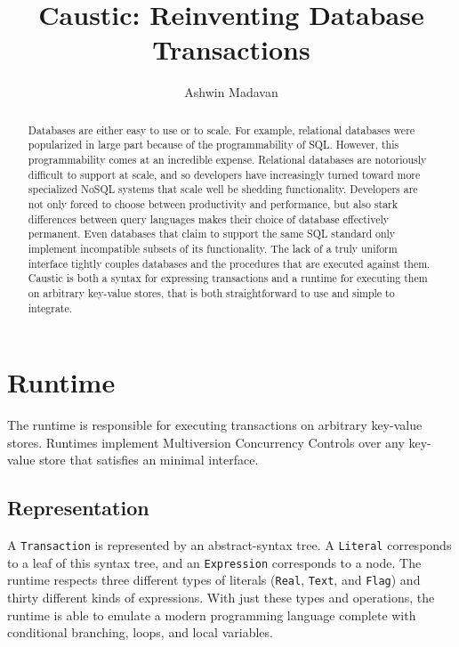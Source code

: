 \documentclass[12pt]{article}
\begin{document}
\title{Caustic: Reinventing Database Transactions}
\author{Ashwin Madavan}
\maketitle

\begin{abstract}
Databases are either easy to use or to scale. For example, relational databases were popularized in
large part because of the programmability of SQL. However, this programmability comes at an
incredible expense. Relational databases are notoriously difficult to support at scale, and so
developers have increasingly turned toward more specialized NoSQL systems that scale well be
shedding functionality. Developers are not only forced to choose between productivity and
performance, but also stark differences between query languages makes their choice of database
effectively permanent. Even databases that claim to support the same SQL standard only implement
incompatible subsets of its functionality. The lack of a truly uniform interface tightly couples
databases and the procedures that are executed against them. Caustic is both a syntax for expressing
transactions and a runtime for executing them on arbitrary key-value stores, that is both
straightforward to use and simple to integrate.
\end{abstract}

\section{Runtime}
  The runtime is responsible for executing transactions on arbitrary key-value stores. Runtimes
  implement Multiversion Concurrency Controls over any key-value store that satisfies an minimal
  interface.

  \subsection{Representation}
    A \texttt{Transaction} is represented by an abstract-syntax tree. A \texttt{Literal} corresponds
    to a leaf of this syntax tree, and an \texttt{Expression} corresponds to a node. The runtime
    respects three different types of literals (\texttt{Real}, \texttt{Text}, and \texttt{Flag}) and
    thirty different kinds of expressions. With just these types and operations, the runtime is able
    to emulate a modern programming language complete with conditional branching, loops, and local
    variables.
\end{document}
